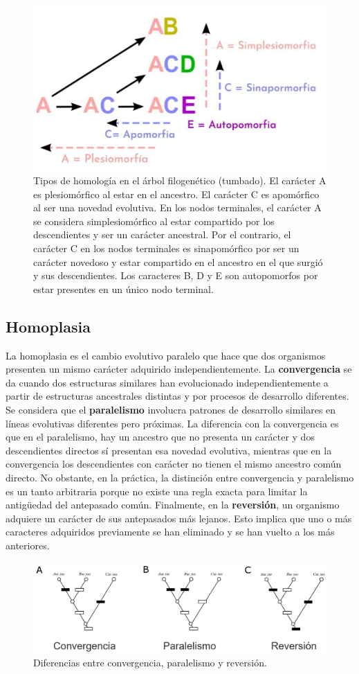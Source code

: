 \begin{figure}[htbp]
\centering
\includegraphics[width=0.5\linewidth]{figs/sinapomorfia.jpg}
\caption{Tipos de homología en el árbol filogenético (tumbado). El carácter A es plesiomórfico al estar en el ancestro. El carácter C es apomórfico al ser una novedad evolutiva. En los nodos terminales, el carácter A se considera simplesiomórfico al estar compartido por los descendientes y ser un carácter ancestral. Por el contrario, el carácter C en los nodos terminales es sinapomórfico por ser un carácter novedoso y estar compartido en el ancestro en el que surgió y sus descendientes. Los caracteres B, D y E son autopomorfos por estar presentes en un único nodo terminal.}
\end{figure}

\subsection{Homoplasia}
La homoplasia es el cambio evolutivo paralelo que hace que dos organismos presenten un mismo carácter adquirido independientemente. La \textbf{convergencia} se da cuando dos estructuras similares han evolucionado independientemente a partir de estructuras ancestrales distintas y por procesos de desarrollo diferentes. Se considera que el \textbf{paralelismo} involucra patrones de desarrollo similares en líneas evolutivas diferentes pero próximas. La diferencia con la convergencia es que en el paralelismo, hay un ancestro que no presenta un carácter y dos descendientes directos sí presentan esa novedad evolutiva, mientras que en la convergencia los descendientes con carácter no tienen el mismo ancestro común directo. No obstante, en la práctica, la distinción entre convergencia y paralelismo es un tanto arbitraria porque no existe una regla exacta para limitar la antigüedad del antepasado común. Finalmente, en la \textbf{reversión}, un organismo adquiere un carácter de sus antepasados más lejanos. Esto implica que uno o más caracteres adquiridos previamente se han eliminado y se han vuelto a los más anteriores. 

\begin{figure}[htbp]
\centering
\includegraphics[width=0.5\linewidth]{figs/homoplasia.png}
\caption{Diferencias entre convergencia, paralelismo y reversión.}
\end{figure}

